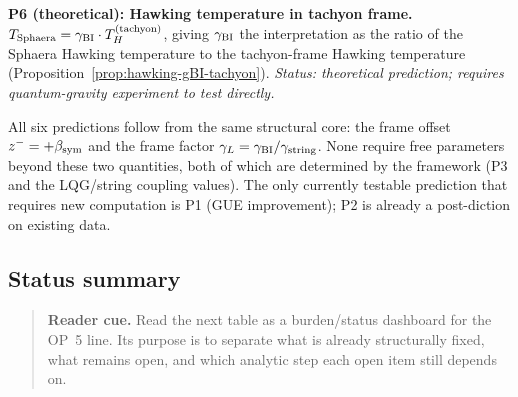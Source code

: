 \begin{corollary}
\bigskip
\noindent\textbf{P6 (theoretical): Hawking temperature in tachyon frame.}\\
$T_{\mathrm{Sphaera}} = \gamma_{\mathrm{BI}}\cdot T_H^{(\mathrm{tachyon})}$, giving
$\gamma_{\mathrm{BI}}$ the interpretation as the ratio of the Sphaera Hawking temperature
to the tachyon-frame Hawking temperature
(Proposition~\ref{prop:hawking-gBI-tachyon}).
\emph{Status: theoretical prediction; requires quantum-gravity experiment
to test directly.}
\end{corollary}



\begin{remark}
All six predictions follow from the same structural core: the frame offset
$z^- = +\beta_{\mathrm{sym}}$ and the frame factor $\gamma_L = \gamma_{\mathrm{BI}}/\gamma_{\mathrm{string}}$. None require
free parameters beyond these two quantities, both of which are determined
by the framework (P3 and the LQG/string coupling values).
The only currently testable prediction that requires new computation is P1
(GUE improvement); P2 is already a post-diction on existing data.
\end{remark}

\subsection{Status summary}

\begin{quote}\small
\noindent\textbf{Reader cue.} Read the next table as a burden/status dashboard for the OP~5 line. Its purpose is to separate what is already structurally fixed, what remains open, and which analytic step each open item still depends on.
\end{quote}

